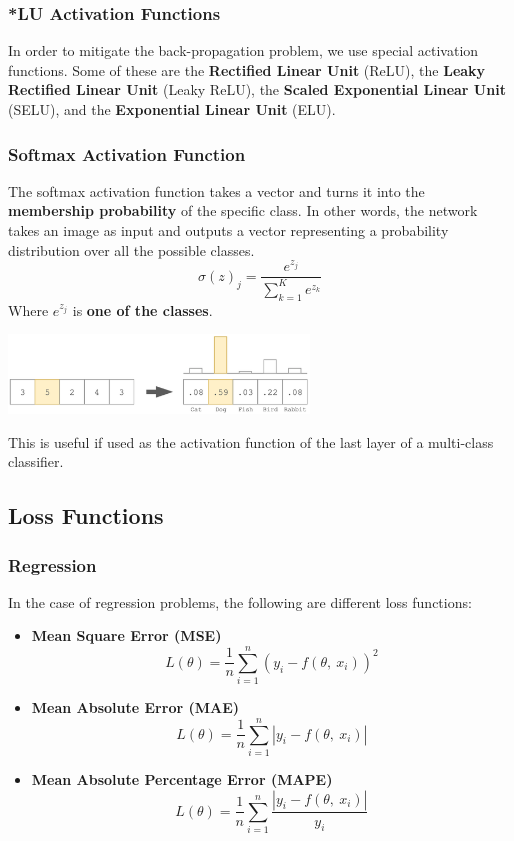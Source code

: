 \documentclass{article}
\begin{document}
\subsubsection{*LU Activation Functions}
In order to mitigate the back-propagation problem, we use special activation functions. Some of these are the \textbf{Rectified Linear Unit} (ReLU), the \textbf{Leaky Rectified Linear Unit} (Leaky ReLU), the \textbf{Scaled Exponential Linear Unit} (SELU), and the \textbf{Exponential Linear Unit} (ELU).

\subsubsection{Softmax Activation Function}
The softmax activation function takes a vector and turns it into the \textbf{membership probability} of the specific class. In other words, the network takes an image as input and outputs a vector representing a probability distribution over all the possible classes.
\[ \sigma (z)_j = \frac{e^{z_j}}{\sum^K_{k = 1}e^{z_k}} \]
Where $e^{z_j}$ is \textbf{one of the classes}.

\begin{center}
	\includegraphics[width=8cm]{assets/softmax.png}
\end{center}
This is useful if used as the activation function of the last layer of a multi-class classifier.

\subsection{Loss Functions}
\subsubsection{Regression}
In the case of regression problems, the following are different loss functions:

\begin{itemize}
	\item \textbf{Mean Square Error (MSE)}
	\[ L(\theta) = \displaystyle\frac{1}{n} \sum^n_{i=1} (y_i - f(\theta,~x_i))^2 \]
	
	\item \textbf{Mean Absolute Error (MAE)}
	\[ L(\theta) = \displaystyle\frac{1}{n} \sum^n_{i=1} \left|y_i - f(\theta,~x_i)\right| \]
	
	\item \textbf{Mean Absolute Percentage Error (MAPE)}
	\[ L(\theta) = \displaystyle\frac{1}{n} \sum^n_{i=1} \frac{\left|y_i - f(\theta,~x_i)\right|}{y_i} \]
\end{itemize}
\end{document}
